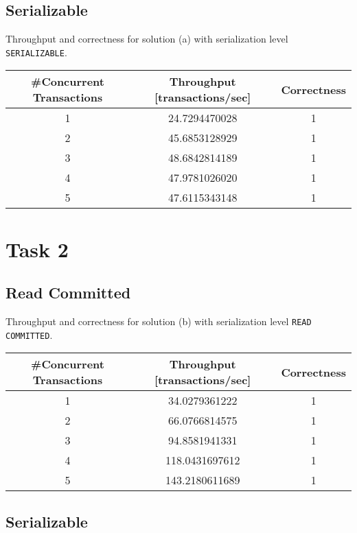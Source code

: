 \documentclass[11pt]{scrartcl}
\begin{document}
\medskip

\subsection*{Serializable}

Throughput and correctness for solution (a) with serialization level
{\tt\small SERIALIZABLE}.

\bigskip

\begin{tabular}{c|c|c}
  \#Concurrent Transactions & Throughput [transactions/sec] & Correctness
  \\\hline
  1 & 24.7294470028 & 1\\
  2 & 45.6853128929 & 1\\
  3 & 48.6842814189 & 1\\
  4 & 47.9781026020 & 1\\
  5 & 47.6115343148 & 1\\    
\end{tabular}

\medskip

\section*{Task 2}

\subsection*{Read Committed}

Throughput and correctness for solution (b) with serialization level
{\tt\small READ COMMITTED}.

\bigskip

\begin{tabular}{c|c|c}
  \#Concurrent Transactions & Throughput [transactions/sec] & Correctness
  \\\hline
  1 & 34.0279361222 & 1\\
  2 & 66.0766814575 & 1\\
  3 & 94.8581941331 & 1\\
  4 & 118.0431697612 & 1\\
  5 & 143.2180611689 & 1\\    
\end{tabular}

\medskip

\subsection*{Serializable}
\end{document}

